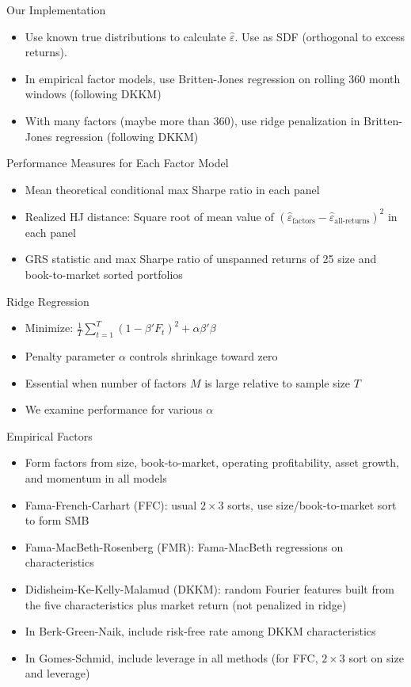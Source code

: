 \documentclass[aspectratio=169]{beamer}
\begin{document}
\begin{frame}{Our Implementation}
\begin{itemize}
\item Use known true distributions to calculate $\hat \varepsilon$.  Use as SDF (orthogonal to excess returns).
\item In empirical factor models, use Britten-Jones regression on rolling 360 month windows (following DKKM)
\item With many factors (maybe more than 360), use ridge penalization in Britten-Jones regression (following DKKM)
\end{itemize}
\end{frame}

\begin{frame}{Performance Measures for Each Factor Model}
\begin{itemize}
\item Mean theoretical conditional max Sharpe ratio in each panel
\item Realized HJ distance: Square root of mean value of $(\hat \varepsilon_{\text{factors}} - \hat \varepsilon_{\text{all-returns}})^2$ in each panel
\item GRS statistic and max Sharpe ratio of unspanned returns of 25 size and book-to-market sorted portfolios
\end{itemize}
\end{frame}

\begin{frame}{Ridge Regression}
\begin{itemize}
  \item Minimize: $\frac{1}{T}\sum_{t=1}^T (1 - \beta' F_t)^2 + \alpha \beta'\beta$
  \item Penalty parameter $\alpha$ controls shrinkage toward zero
  \item Essential when number of factors $M$ is large relative to sample size $T$
  \item We examine performance for various $\alpha$
\end{itemize}
\end{frame}

\begin{frame}{Empirical Factors}
\begin{itemize}
\item Form factors from size, book-to-market, operating profitability, asset growth, and momentum in all models
\item Fama-French-Carhart (FFC): usual $2\times 3$ sorts, use size/book-to-market sort to form SMB
\item Fama-MacBeth-Rosenberg (FMR): Fama-MacBeth regressions on characteristics
\item Didisheim-Ke-Kelly-Malamud (DKKM): random Fourier features built from the five characteristics plus market return (not penalized in ridge)
\item In Berk-Green-Naik, include risk-free rate among DKKM characteristics
\item In Gomes-Schmid, include leverage in all methods (for FFC, $2\times 3$ sort on size and leverage)
\end{itemize}
\end{frame}
\end{document}
